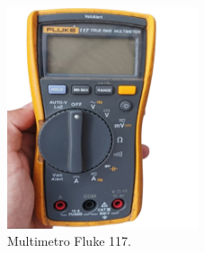 \documentclass[a4paper, 12pt]{article}
\begin{document}
\begin{figure}[h] %
    \centering
    \includegraphics[width=0.5\textwidth]{img/Multimetro digital.png} %
    \caption{Multimetro Fluke 117.}
    \label{fig:MulDigital}
\end{figure}
\end{document}
